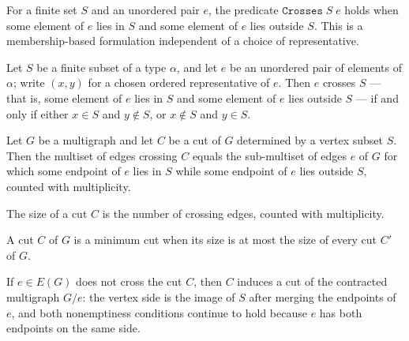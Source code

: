 \begin{definition}
\label{Crosses}
\leanok
For a finite set $S$ and an unordered pair $e$, the predicate $\texttt{Crosses}\;S\;e$
holds when some element of $e$ lies in $S$ and some element of $e$ lies outside $S$.
This is a membership-based formulation independent of a choice of representative.
\end{definition}

\begin{lemma}
\label{crosses_iff_out}
\leanok
{}
Let $S$ be a finite subset of a type $\alpha$, and let $e$ be an unordered pair of
elements of $\alpha$; write $(x,y)$ for a chosen ordered representative of $e$. Then $e$
crosses $S$ — that is, some element of $e$ lies in $S$ and some element of $e$ lies
outside $S$ — if and only if either $x \in S$ and $y \notin S$, or $x \notin S$ and $y
\in S$.
\end{lemma}

\begin{lemma}
\label{crossingEdges_eq_filter_crosses}
\leanok
{}
Let $G$ be a multigraph and let $C$ be a cut of $G$ determined by a vertex subset $S$.
Then the multiset of edges crossing $C$ equals the sub-multiset of edges $e$ of $G$ for
which some endpoint of $e$ lies in $S$ while some endpoint of $e$ lies outside $S$,
counted with multiplicity.
\end{lemma}

\begin{definition}
\label{MulCut.size}
\leanok
{}
The size of a cut $C$ is the number of crossing edges, counted with multiplicity.
\end{definition}

\begin{definition}
\label{IsMulMinCut}
\leanok
{}
A cut $C$ of $G$ is a minimum cut when its size is at most the size of every cut $C'$
of $G$.
\end{definition}

\begin{definition}
\label{MulCut.contractedCut}
\leanok
{}
If $e \in E(G)$ does not cross the cut $C$, then $C$ induces a cut of the contracted
multigraph $G/e$: the vertex side is the image of $S$ after merging the endpoints of
$e$, and both nonemptiness conditions continue to hold because $e$ has both endpoints
on the same side.
\end{definition}

